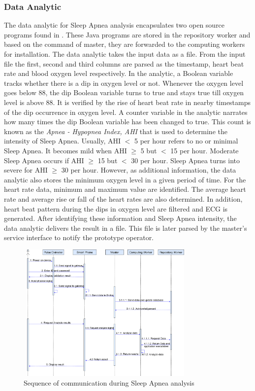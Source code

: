 \documentclass[final,5p,times,twocolumn]{elsarticle}
\begin{document}
\subsubsection{Data Analytic}
The data analytic for Sleep Apnea analysis encapsulates two open source programs found in \cite{link1}\cite{link2}. These Java programs are stored in the repository worker and based on the command of master, they are forwarded to the computing workers for installation. The data analytic takes the input data as a file. From the input file the first, second and third columns are parsed as the timestamp, heart beat rate and blood oxygen level respectively. In the analytic, a Boolean variable tracks whether there is a dip in oxygen level or not. Whenever the oxygen level goes below 88, the dip Boolean variable turns to true and stays true till oxygen level is above 88. It is verified by the rise of heart beat rate in nearby timestamps of the dip occurrence in oxygen level. A counter variable in the analytic narrates how many times the dip Boolean variable has been changed to true. This count is known as the \textit{Apnea - Hypopnea Index, AHI} that is used to determine the intensity of Sleep Apnea. Usually, AHI $<$ 5 per hour refers to no or minimal Sleep Apnea. It becomes mild when AHI $\geq$ 5 but $<$ 15 per hour. Moderate Sleep Apnea occurs if AHI $\geq$ 15 but $<$ 30 per hour. Sleep Apnea turns into severe for AHI $\geq$ 30 per hour. However, as additional information, the data analytic also stores the minimum oxygen level in a given period of time. For the heart rate data, minimum and maximum value are identified. The average heart rate and average rise or fall of the heart rates are also determined. In addition, heart beat pattern during the dips in oxygen level are filtered and ECG is generated. After identifying these information and Sleep Apnea intensity, the data analytic delivers the result in a file. This file is later parsed by the master's service interface to notify the prototype operator.
%
%
\begin{figure}[!t]
\centering 
\includegraphics[width=88mm, height=68mm]{Communication.png}
\caption{Sequence of communication during Sleep Apnea analysis}
\label{Fig:pro_com}
\end{figure}
%
\end{document}
